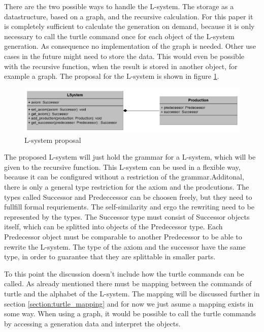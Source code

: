 \documentclass[english]{cpp-hmwk}
\begin{document}
\bigskip
 
\noindent There are the two possible ways to handle the L-system. The storage as a datastructure, based on a graph, and the recursive calculation. For this paper it is completely sufficient to calculate the generation on demand, because it is only necessary to call the turtle command once for each object of the L-system generation. As consequence no implementation of the graph is needed. Other use cases in the future might need to store the data. This would even be possible with the recursive function, when the result is stored in another object, for example a graph. The proposal for the L-system is shown in figure \ref{figure:lsystem_proposal}.

\begin{figure}[h!]
	\centering
	\includegraphics[width=1\columnwidth]{../graphs/LSystem/examples/l_system_proposal.png}
	\caption{L-system proposal}
	\label{figure:lsystem_proposal}
\end{figure}

\medskip
\noindent The proposed L-system will just hold the grammar for a L-system, which will be given to the recursive function. This L-system can be used in a flexible way, because it can be configured without a restriction of the grammar.Additonal, there is only a general type restriction for the axiom and the prodcutions. The types called Successor and Predeccessor can be choosen freely, but they need to fullfill formal requriements. The self-similarity and ergo the rewriting need to be represented by the types. The Successor type must consist of Successor objects itself, which can be splitted into objects of the Predecessor type. Each Predecessor object must be comparable to another Predecessor to be able to rewrite the L-system. 
 The type of the axiom and the successor have the same type, in order to guarantee that they are splittable in smaller parts.
 
To this point the discussion doesn't include how the turtle commands can be called. As already mentioned there must be mapping between the commands of turtle and the alphabet of the L-system. The mapping will be discussed further in section \ref{section:turtle_mapping} and for now we just asume a mapping exists in some way. When using a graph, it would be possible to call the turtle commands by accessing a generation data and interpret the objects.
\end{document}
